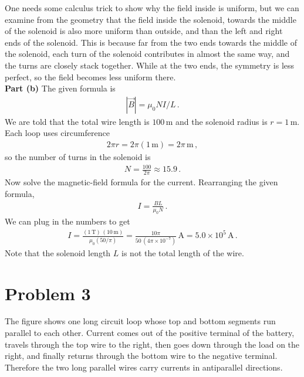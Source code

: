\documentclass[11pt]{article}
\begin{document}
One needs some calculus trick to show why the field inside is uniform, but we can examine from the geometry that the field inside the solenoid, towards the middle of the solenoid is also more uniform than outside, and than the left and right ends of the solenoid. This is because far from the two ends towards the middle of the solenoid, each turn of the solenoid contributes in almost the same way, and the turns are closely stack together. While at the two ends, the symmetry is less perfect, so the field becomes less uniform there.\\

\noindent\textbf{Part (b)} The given formula is
\begin{align*}
|\vec{B}| = \mu_0 NI/L\,.
\end{align*}
We are told that the total wire length is $100$\,m and the solenoid radius is $r=1$\,m. Each loop uses circumference
\begin{align*}
2\pi r = 2\pi(1\,\text{m}) = 2\pi\,\text{m}\,,
\end{align*}
so the number of turns in the solenoid is
\begin{align*}
N = \frac{100}{2\pi}\approx 15.9\,.
\end{align*}
Now solve the magnetic-field formula for the current. Rearranging the given formula,
\begin{align*}
I = \frac{BL}{\mu_0 N}\,.
\end{align*}
We can plug in the numbers to get
\begin{align*}
I = \frac{(1\,\text{T})\,(10\,\text{m})}{\mu_0(50/\pi)}
= \frac{10\pi}{50\,(4\pi\times 10^{-7})}\,\text{A}
= 5.0\times 10^5\,\text{A}\,.
\end{align*}
Note that the solenoid length $L$ is not the total length of the wire.\\


\section*{Problem 3}

The figure shows one long circuit loop whose top and bottom segments run parallel to each other. Current comes out of the positive terminal of the battery, travels through the top wire to the right, then goes down through the load on the right, and finally returns through the bottom wire to the negative terminal. Therefore the two long parallel wires carry currents in antiparallel directions.\\
\end{document}
